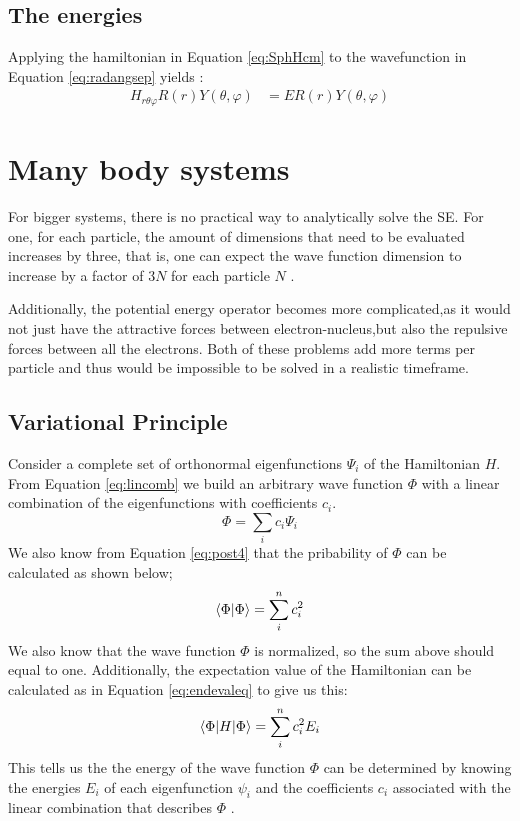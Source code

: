 \documentclass[../master_thesis.tex]{subfiles}
\begin{document}
\subsection{The energies}

Applying the hamiltonian in Equation \ref{eq:SphHcm} to the wavefunction in
Equation \ref{eq:radangsep} yields \cite{Atkins:2014}:
\begin{equation}
  \begin{split}
    H_{r\theta\varphi} R(r)Y(\theta, \varphi) &= E R(r)Y(\theta, \varphi)
  \end{split}
\end{equation}
\section{Many body systems}

For bigger systems, there is no practical way to analytically solve the
\ac{SE}. For one, for each particle, the amount of dimensions that need to be
evaluated increases by three, that is, one can expect the wave function
dimension to increase by a factor of $3N$ for each particle $N$
\cite{Cramer:2004}.

Additionally, the potential energy operator becomes more complicated,as it
would not just have the attractive forces between electron-nucleus,but also the
repulsive forces between all the electrons. Both of these problems add more
terms per particle and thus would be impossible to be solved in a realistic
timeframe. %

\subsection{Variational Principle}
Consider a complete set of orthonormal eigenfunctions $ \Psi_i$  of the
Hamiltonian $H$. From Equation \ref{eq:lincomb} we build an arbitrary
wave function $\Phi$ with a linear combination of the eigenfunctions with
coefficients $c_i$.
\begin{equation}
  \Phi = \sum\limits_ic_i\Psi_i
\end{equation}
We also know from Equation \ref{eq:post4} that the pribability of $\Phi$ can
be calculated as shown below;
\begin{equation}
  \braket{\Phi|\Phi} = \sum\limits_i^nc_i^2
\end{equation}
We also know that the wave function $\Phi$ is normalized, so the sum above
should equal to one. Additionally, the expectation value of the Hamiltonian can
be calculated as in Equation \ref{eq:endevaleq} to give us this:
\begin{equation}
  \braket{\Phi|H|\Phi} = \sum\limits_i^nc_i^2E_i\label{eq:genenerg}
\end{equation}
This tells us the the energy of the wave function $\Phi$ can be determined by
knowing the energies $E_i$ of each eigenfunction $\psi_i$ and the coefficients
$c_i$ associated with the linear combination that describes $\Phi$
\cite{Cramer:2004}.
\end{document}
